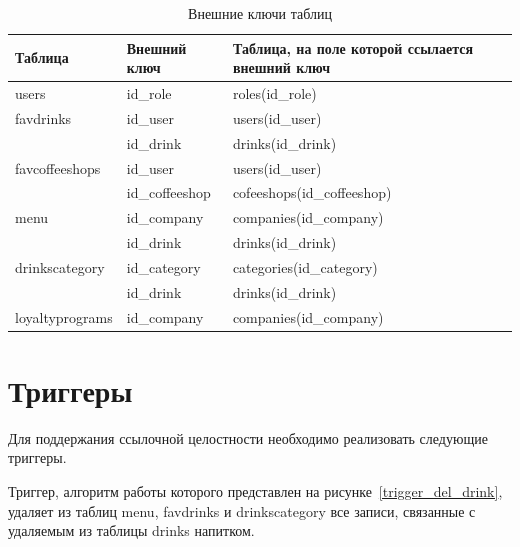 \newpage
\begin{table}[ht]
	\begin{center}
		\begin{threeparttable}
			\caption{\label{fk_table} Внешние ключи таблиц}
			\begin{tabular}{|p{5cm}|p{4cm}|p{6cm}|c|}
				\hline	
				\textbf{Таблица} & \textbf{Внешний ключ} & \textbf{Таблица, на поле которой ссылается внешний ключ}  \\ \hline
				
				users & id\_role & roles(id\_role) \\ \hline
				
				favdrinks & id\_user & users(id\_user) \\ 
				 & id\_drink & drinks(id\_drink) \\ \hline
				 
				 favcoffeeshops & id\_user & users(id\_user) \\ 
				 & id\_coffeeshop & cofeeshops(id\_coffeeshop) \\ \hline
				 
				 menu & id\_company & companies(id\_company) \\ 
				 & id\_drink & drinks(id\_drink) \\ \hline
				 
				 drinkscategory & id\_category & categories(id\_category) \\ 
				 & id\_drink & drinks(id\_drink) \\ \hline
				 
				 loyaltyprograms & id\_company & companies(id\_company) \\ \hline
			
				
			\end{tabular}
		\end{threeparttable}
	\end{center}
\end{table}

\section{Триггеры}
Для поддержания ссылочной целостности необходимо реализовать следующие триггеры.

Триггер, алгоритм работы которого представлен на рисунке~\ref{trigger_del_drink}, удаляет из таблиц menu, favdrinks и drinkscategory все записи, связанные с удаляемым из таблицы drinks напитком.

